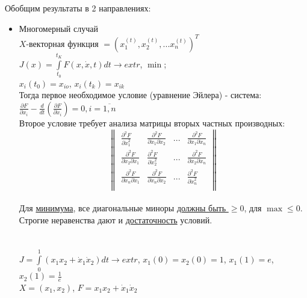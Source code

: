 \documentclass[preprint,russian,a5paper,10pt,twoside,mediummath]{ncc}
\begin{document}
Обобщим результаты в 2 направлениях:
\begin{itemize}
\item Многомерный случай
\\$X$-векторная функция $={{\left( x_{1}^{\left( t \right)},x_{2}^{\left( t \right)},...x_{n}^{\left( t \right)} \right)}^{T}}$ 
\\$J\left( x \right)=\int\limits_{{{t}_{0}}}^{{{t}_{K}}}{F\left( x,\dot{x},t \right)}dt\to extr$, $\min $;
\\${{x}_{i}}\left( {{t}_{0}} \right)={{x}_{io}}$, ${{x}_{i}}\left( {{t}_{k}} \right)={{x}_{ik}}$
\\Тогда первое необходимое условие (уравнение Эйлера) - система: $\frac{\partial F}{\partial {{x}_{i}}}-\frac{d}{dt}\left( \frac{\partial F}{\partial {{{\dot{x}}}_{i}}} \right)=0,i=\overline{1,n}$ 
\\Второе условие требует анализа матрицы вторых частных производных:
\[\left\| \begin{array}{*{35}{l}}
   \frac{{{\partial }^{2}}F}{\partial \dot{x}_{1}^{2}} & \frac{{{\partial }^{2}}F}{\partial {{{\dot{x}}}_{1}}\partial {{{\dot{x}}}_{2}}} & ... & \frac{{{\partial }^{2}}F}{\partial {{{\dot{x}}}_{1}}\partial {{{\dot{x}}}_{n}}}  \\
   \frac{{{\partial }^{2}}F}{\partial {{{\dot{x}}}_{2}}\partial {{{\dot{x}}}_{1}}} & \frac{{{\partial }^{2}}F}{\partial \dot{x}_{2}^{2}} & ... & \frac{{{\partial }^{2}}F}{\partial {{{\dot{x}}}_{2}}\partial {{{\dot{x}}}_{n}}}  \\
   \frac{{{\partial }^{2}}F}{\partial {{{\dot{x}}}_{n}}\partial {{{\dot{x}}}_{1}}} & \frac{{{\partial }^{2}}F}{\partial {{{\dot{x}}}_{n}}\partial {{{\dot{x}}}_{2}}} & ... & \frac{{{\partial }^{2}}F}{\partial \dot{x}_{n}^{2}}  \\
\end{array} \right\|\]
\\Для \underline{минимума}, все диагональные миноры \underline{должны быть $\ge 0$}, для \underline{$\max \le 0$}. Строгие неравенства дают и \underline{достаточность} условий.
\\
\\
\\$J=\int\limits_{0}^{1}{\left( {{x}_{1}}{{x}_{2}}+{{{\dot{x}}}_{1}}{{{\dot{x}}}_{2}} \right)}dt\to extr$, ${{x}_{1}}\left( 0 \right)={{x}_{2}}\left( 0 \right)=1$, ${{x}_{1}}\left( 1 \right)=e$, ${{x}_{2}}\left( 1 \right)=\frac{1}{e}$ 
\\$X=\left( {{x}_{1}},{{x}_{2}} \right)$, $F={{x}_{1}}{{x}_{2}}+{{\dot{x}}_{1}}{{\dot{x}}_{2}}$

\end{itemize}
\end{document}
